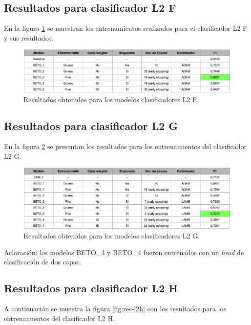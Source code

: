 \subsection{Resultados para clasificador L2 F}

En la figura \ref{fig:res-l2f} se muestran los entrenamientos realizados para el clasificador L2 F y sus resultados.

\begin{figure}[H]
	\centering
	\includegraphics[width=1\textwidth]{./Figures/cap4-resultados-l2f.png}
	\caption{Resultados obtenidos para los modelos clasificadores L2 F.}
	\label{fig:res-l2f}
\end{figure}

\subsection{Resultados para clasificador L2 G}

En la figura \ref{fig:res-l2g} se presentan los resultados para los entrenamientos del clasificador L2 G.

\begin{figure}[htbp]
	\centering
	\includegraphics[width=1\textwidth]{./Figures/cap4-resultados-l2g.png}
	\caption{Resultados obtenidos para los modelos clasificadores L2 G.}
	\label{fig:res-l2g}
\end{figure}

Aclaración: los modelos BETO\_3 y BETO\_4 fueron entrenados con un \textit{head} de clasificación de dos capas.

\subsection{Resultados para clasificador L2 H}

A continuación se muestra la figura \ref{fig:res-l2h} con los resultados para los entrenamientos del clasificador L2 H.

